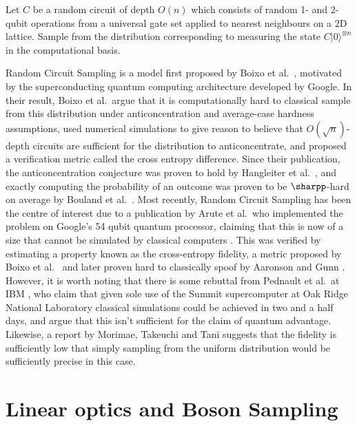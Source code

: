 \begin{problem} Let $C$ be a random circuit of depth $O(n)$ which consists of random 1- and 2-qubit operations from a universal gate set applied to nearest neighbours on a 2D lattice. Sample from the distribution corresponding to measuring the state $C|0\rangle^{\otimes n}$ in the computational basis.
\end{problem}

Random Circuit Sampling is a model first proposed by Boixo et al.~\cite{boixo2018}, motivated by the superconducting quantum computing architecture developed by Google. In their result, Boixo et al.\ argue that it is computationally hard to classical sample from this distribution under anticoncentration and average-case hardness assumptions, used numerical simulations to give reason to believe that $O(\sqrt{n})$-depth circuits are sufficient for the distribution to anticoncentrate, and proposed a verification metric called the cross entropy difference. Since their publication, the anticoncentration conjecture was proven to hold by Hangleiter et al.~\cite{hangleiter2018}, and exactly computing the probability of an outcome was proven to be $\sharpp$-hard on average by Bouland et al.~\cite{bouland2018}. Most recently, Random Circuit Sampling has been the centre of interest due to a publication by Arute et al.\ who implemented the problem on Google's 54 qubit quantum processor, claiming that this is now of a size that cannot be simulated by classical computers \cite{arute2019}. This was verified by estimating a property known as the cross-entropy fidelity, a metric proposed by Boixo et al.~\cite{boixo2018} and later proven hard to classically spoof by Aaronson and Gunn \cite{aaronson2019}. However, it is worth noting that there is some rebuttal from Pednault et al.\ at IBM \cite{pednault2019}, who claim that given sole use of the Summit supercomputer at Oak Ridge National Laboratory classical simulations could be achieved in two and a half days, and argue that this isn't sufficient for the claim of quantum advantage. Likewise, a report by Morimae, Takeuchi and Tani \cite{morimae2019google} suggests that the fidelity is sufficiently low that simply sampling from the uniform distribution would be sufficiently precise in this case.

\section{Linear optics and Boson Sampling}
\label{sec:lo-bs}

